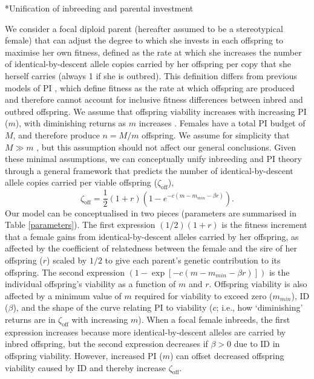 \documentclass[12pt]{article}
\makeatletter
\renewcommand\section{\@startsection{section}{1}{0in}{-0.5\baselineskip}{0.1\baselineskip}{\normalfont\large\bfseries}}
\makeatother
\begin{document}
\section*{Unification of inbreeding and parental investment}

We consider a focal diploid parent (hereafter assumed to be a stereotypical female) that can adjust the degree to which she invests in each offspring to maximise her own fitness, defined as the rate at which she increases the number of identical-by-descent allele copies carried by her offspring per copy that she herself carries (always 1 if she is outbred). This definition differs from previous models of PI \cite[e.g.,][]{Macnair1978, Parker1978}, which define fitness as the rate at which offspring are produced and therefore cannot account for inclusive fitness differences between inbred and outbred offspring. We assume that offspring viability increases with increasing PI ($m$), with diminishing returns as $m$ increases \cite[following][]{Parker1978}. Females have a total PI budget of $M$, and therefore produce $n=M/m$ offspring. We assume for simplicity that $M \gg m$ \cite[following][]{Parker1985}, but this assumption should not affect our general conclusions. Given these minimal assumptions, we can conceptually unify inbreeding and PI theory through a general framework that predicts the number of identical-by-descent allele copies carried per viable offspring ($\zeta_{\textrm{off}}$),
\begin{equation} \label{maineq}
\zeta_{\textrm{off}} = \frac{1}{2}\left(1+r\right)\left(1-e^{-c\left(m-m_{min}-\beta r\right)}\right).
\end{equation}
Our model can be conceptualised in two pieces (parameters are summarised in Table \ref{parameters}). The first expression $\left(1/2\right) \left(1 + r\right)$ is the fitness increment that a female gains from identical-by-descent alleles carried by her offspring, as affected by the coefficient of relatedness between the female and the sire of her offspring ($r$) scaled by $1/2$ to give each parent's genetic contribution to its offspring. The second expression $\left(1 - \exp\left[-c\left(m-m_{min}-\beta r\right)\right]\right)$ is the individual offspring's viability as a function of $m$ and $r$. Offspring viability is also affected by a minimum value of $m$ required for viability to exceed zero ($m_{min}$), ID ($\beta$), and the shape of the curve relating PI to viability ($c$; i.e., how `diminishing' returns are in $\zeta_{\textrm{off}}$ with increasing $m$). When a focal female inbreeds, the first expression increases because more identical-by-descent alleles are carried by inbred offspring, but the second expression decreases if $\beta>0$ due to ID in offspring viability. However, increased PI ($m$) can offset decreased offspring viability caused by ID and thereby increase $\zeta_{\textrm{off}}$. 
\end{document}
